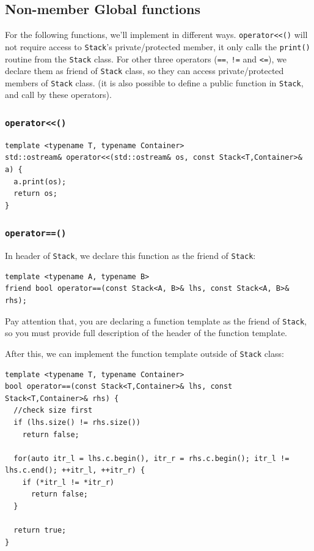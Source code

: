 \documentclass[12pt]{book}
\begin{document}
\subsection{Non-member Global functions}
\label{sec:org1ba0669}
For the following functions, we'll implement in different ways. \texttt{operator<<()} will not require access to \texttt{Stack}'s private/protected member, it only calls the \texttt{print()} routine from the \texttt{Stack} class. For other three operators (\texttt{==}, \texttt{!=} and \texttt{<=}), we declare them as friend of \texttt{Stack} class, so they can access private/protected members of \texttt{Stack} class. (it is also possible to define a public function in \texttt{Stack}, and call by these operators).
\subsubsection{\texttt{operator<<()}}
\label{sec:orgd45c8ce}
\begin{verbatim}
template <typename T, typename Container>
std::ostream& operator<<(std::ostream& os, const Stack<T,Container>& a) {
  a.print(os);
  return os;
}
\end{verbatim}
\subsubsection{\texttt{operator==()}}
\label{sec:orgdef4a6c}
In header of \texttt{Stack}, we declare this function as the friend of \texttt{Stack}:
\begin{verbatim}
template <typename A, typename B>
friend bool operator==(const Stack<A, B>& lhs, const Stack<A, B>& rhs);
\end{verbatim}

Pay attention that, you are declaring a function template as the friend of \texttt{Stack}, so you must provide full description of the header of the function template.

After this, we can implement the function template outside of \texttt{Stack} class:
\begin{verbatim}
template <typename T, typename Container>
bool operator==(const Stack<T,Container>& lhs, const Stack<T,Container>& rhs) {
  //check size first
  if (lhs.size() != rhs.size())
    return false;

  for(auto itr_l = lhs.c.begin(), itr_r = rhs.c.begin(); itr_l != lhs.c.end(); ++itr_l, ++itr_r) {
    if (*itr_l != *itr_r)
      return false;
  }

  return true;
}
\end{verbatim}
\end{document}
